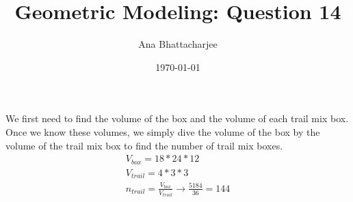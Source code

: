 \documentclass{article}
\begin{document}
\title{Geometric Modeling: Question 14}
\author{Ana Bhattacharjee}
\date{\today}

\begin{center}
We first need to find the volume of the box and the volume of each trail mix box. Once we know these volumes, we simply dive the volume of the box by the volume of the trail mix box to find the number of trail mix boxes.
\begin{align}
  V_{box} = 18 * 24 * 12 \\
  V_{trail} = 4 * 3 * 3 \\
  n_{trail} = \frac{V_{box}}{V_{trail}} \rightarrow \frac{5184}{36} = 144 
\end{align}
\end{center}
\end{document}

